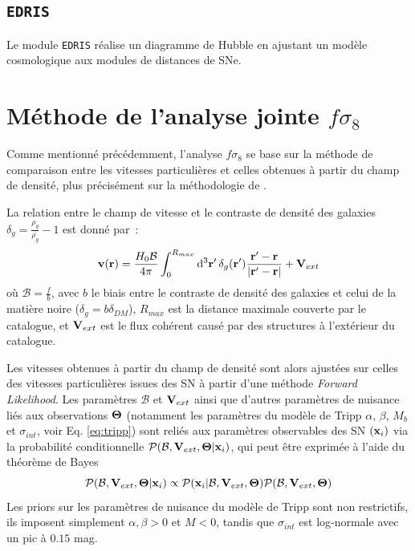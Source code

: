 \documentclass{book}
\def\edris{\texttt{EDRIS}\xspace}
\let\mcl\mathcal
\let\ov\overline
\begin{document}
\subsection{\edris}
\label{anx:edris}

Le module \edris réalise un diagramme de Hubble en ajustant un modèle cosmologique aux modules de distances de SNe.

\section{Méthode de l'analyse jointe $f\sigma_8$}
\label{anx:fs8}

Comme mentionné précédemment, l'analyse $f\sigma_8$ se base sur la méthode de comparaison entre les vitesses particulières et celles obtenues à partir du champ de densité, plus précisément sur la méthodologie de \cite{stahl_peculiar-velocity_2021}.

La relation entre le champ de vitesse et le contraste de densité des galaxies $\delta_g = \frac{\rho_g}{\ov{\rho_g}} - 1$ est donné par~:
\begin{equation}
    \vb v (\vb r) = \frac{H_0 \mcl B}{4 \pi} \int_0^{R_{max}} \dd[3]{\vb r'} \delta_g(\vb r') \frac{\vb r' - \vb r}{\abs{\vb r' - \vb r}} + \vb V_{ext}
\end{equation}
où $\mcl B =\frac{f}{b}$, avec $b$ le biais entre le contraste de densité des galaxies et celui de la matière noire ($\delta_g = b \delta_{DM}$), $R_{max}$ est la distance maximale couverte par le catalogue, et $\vb V_{ext}$ est le flux cohérent causé par des structures à l'extérieur du catalogue.

Les vitesses obtenues à partir du champ de densité sont alors ajustées sur celles des vitesses particulières issues des SN à partir d'une méthode \textit{Forward Likelihood}. Les paramètres $\mcl B$ et $\vb V_{ext}$ ainsi que d'autres paramètres de nuisance liés aux observations $\vb \Theta$ (notamment les paramètres du modèle de Tripp $\alpha$, $\beta$, $M_b$ et $\sigma_{int}$, voir Eq. \ref{eq:tripp}) sont reliés aux paramètres observables des SN $(\vb x_i)$ via la probabilité conditionnelle $\mcl P(\mcl B, \vb V_{ext}, \vb \Theta | \vb x_i)$, qui peut être exprimée à l'aide du théorème de Bayes
\begin{equation}
    \mcl P(\mcl B, \vb V_{ext}, \vb \Theta | \vb x_i) \propto \mcl P(\vb x_i|\mcl B, \vb V_{ext}, \vb \Theta) \mcl P(\mcl B, \vb V_{ext}, \vb \Theta)
\end{equation}
Les priors sur les paramètres de nuisance du modèle de Tripp sont non restrictifs, ils imposent simplement $\alpha, \beta > 0$ et $M < 0$, tandis que $\sigma_{int}$ est log-normale avec un pic à $0.15$ mag.
\end{document}
